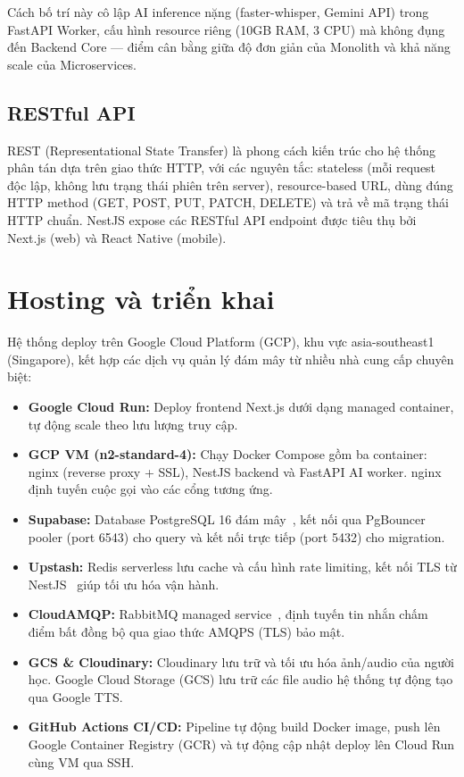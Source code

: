 Cách bố trí này cô lập AI inference nặng (faster-whisper, Gemini API) trong FastAPI Worker, cấu hình resource riêng (10GB RAM, 3 CPU) mà không đụng đến Backend Core --- điểm cân bằng giữa độ đơn giản của Monolith và khả năng scale của Microservices.

\subsection{RESTful API}

REST (Representational State Transfer) là phong cách kiến trúc cho hệ thống phân tán dựa trên giao thức HTTP, với các nguyên tắc: stateless (mỗi request độc lập, không lưu trạng thái phiên trên server), resource-based URL, dùng đúng HTTP method (GET, POST, PUT, PATCH, DELETE) và trả về mã trạng thái HTTP chuẩn. NestJS expose các RESTful API endpoint được tiêu thụ bởi Next.js (web) và React Native (mobile).

\section{Hosting và triển khai}

Hệ thống deploy trên Google Cloud Platform (GCP), khu vực asia-southeast1 (Singapore), kết hợp các dịch vụ quản lý đám mây từ nhiều nhà cung cấp chuyên biệt:
\begin{itemize}
    \item \textbf{Google Cloud Run:} Deploy frontend Next.js dưới dạng managed container, tự động scale theo lưu lượng truy cập.
    \item \textbf{GCP VM (n2-standard-4):} Chạy Docker Compose gồm ba container: nginx (reverse proxy + SSL), NestJS backend và FastAPI AI worker. nginx định tuyến cuộc gọi vào các cổng tương ứng.
    \item \textbf{Supabase:} Database PostgreSQL 16 đám mây~\cite{supabase-docs}, kết nối qua PgBouncer pooler (port 6543) cho query và kết nối trực tiếp (port 5432) cho migration.
    \item \textbf{Upstash:} Redis serverless lưu cache và cấu hình rate limiting, kết nối TLS từ NestJS~\cite{redis-docs} giúp tối ưu hóa vận hành.
    \item \textbf{CloudAMQP:} RabbitMQ managed service~\cite{rabbitmq-docs}, định tuyến tin nhắn chấm điểm bất đồng bộ qua giao thức AMQPS (TLS) bảo mật.
    \item \textbf{GCS \& Cloudinary:} Cloudinary lưu trữ và tối ưu hóa ảnh/audio của người học. Google Cloud Storage (GCS) lưu trữ các file audio hệ thống tự động tạo qua Google TTS.
    \item \textbf{GitHub Actions CI/CD:} Pipeline tự động build Docker image, push lên Google Container Registry (GCR) và tự động cập nhật deploy lên Cloud Run cùng VM qua SSH.
\end{itemize}
